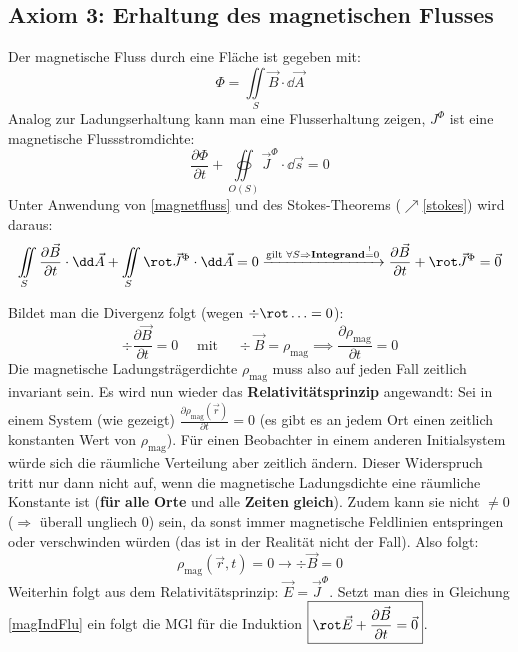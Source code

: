  \subsection{Axiom 3: Erhaltung des magnetischen Flusses}
 Der magnetische Fluss durch eine Fläche ist gegeben mit:
 \begin{equation}\label{magnetfluss}
 	\displaystyle \Phi = \iint\limits_{S} \vec{B}\cdot \dd\vec{A}
 \end{equation}
 Analog zur Ladungserhaltung kann man eine Flusserhaltung zeigen, $J^\Phi$ ist eine magnetische Flussstromdichte:
	       \begin{equation}
\displaystyle \dfrac{\partial \Phi}{\partial t}+ \oiint\limits_{O(S)}\vec{J}
^{\Phi} \cdot \dd\vec{s}= 0
	       \end{equation}
	   Unter Anwendung von \ref{magnetfluss} und des Stokes-Theorems ($\nearrow$\ref{stokes}) wird daraus:
	   \begin{equation}\label{magIndFlu}
	   	\displaystyle \iint\limits_{S} \frac{\partial \vec{B} }{\partial t}\cdot\dd
	   	\vec{A}+ \iint\limits_{S}\rot \vec{J}^{\Phi} \cdot \dd\vec{A}= 0 \xrightarrow{\text{gilt }\forall S \Rightarrow \textbf{Integrand}\stackrel{!}{=}{0}} \frac{\partial
	   		\vec{B} }{\partial t}+ \rot \vec{J}^{\Phi} = \vec{0}
	   \end{equation}
	        

	   Bildet man die Divergenz folgt (wegen $\div \rot \ldots = 0$):
	        \begin{equation}
		        \div \frac{\partial \vec{B} }{\partial t}= 0\quad \text{ mit }\quad \div \vec{B}= \rho_{\text{mag}} \implies \frac{\partial \rho_{\text{mag}}}{\partial t}=0
	        \end{equation}
	   Die magnetische Ladungsträgerdichte $\rho_{\text{mag}}$ muss also auf jeden Fall
	        zeitlich invariant sein. Es wird nun wieder das \textbf{Relativitätsprinzip} angewandt:
		 Sei in einem System (wie gezeigt) $\displaystyle \frac{\partial \rho_{\text{mag}}(\vec{r})}{\partial
				              t}=0$ (es gibt es an jedem Ort einen zeitlich konstanten Wert von $\rho_{\text{mag}}$). Für einen Beobachter in einem anderen Initialsystem würde sich die
		              räumliche Verteilung aber zeitlich ändern. Dieser Widerspruch tritt nur dann nicht auf, wenn die magnetische
		              Ladungsdichte eine räumliche Konstante ist (\textbf{für} \textbf{alle} \textbf{Orte} und alle
		              \textbf{Zeiten} \textbf{gleich}). Zudem kann sie nicht $\neq 0$ ($\Rightarrow$ überall ungliech 0) sein, da sonst immer magnetische Feldlinien entspringen oder verschwinden würden (das ist in der Realität nicht der Fall). Also folgt: 
		              \begin{equation}
			              \rho_{\text{mag}}(\vec{r}, t)=0 \to \boxed{\div \vec{B} = 0}
		              \end{equation}
		         Weiterhin folgt aus dem Relativitätsprinzip: $\vec{E}= \vec{J}^{\Phi}$. Setzt man dies in Gleichung \ref{magIndFlu} ein folgt die MGl für die Induktion $\boxed{\rot \vec{E} + \frac{\partial \vec{B} }{\partial t} = \vec{0}}$.

